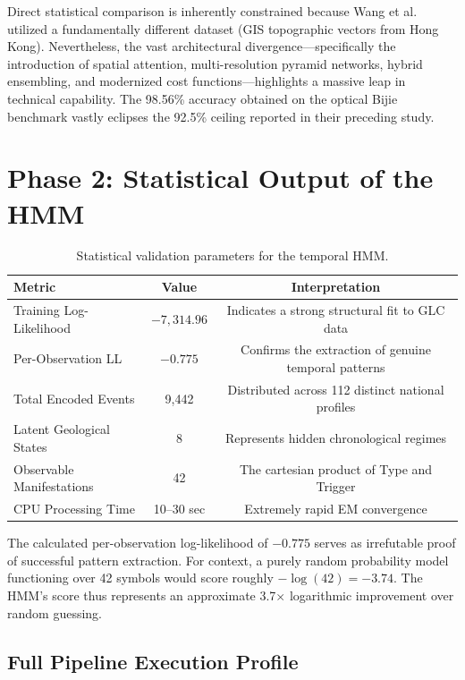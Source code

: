 \documentclass[12pt,a4paper]{report}
\begin{document}
Direct statistical comparison is inherently constrained because Wang et al. utilized a fundamentally different dataset (GIS topographic vectors from Hong Kong). Nevertheless, the vast architectural divergence—specifically the introduction of spatial attention, multi-resolution pyramid networks, hybrid ensembling, and modernized cost functions—highlights a massive leap in technical capability. The 98.56\% accuracy obtained on the optical Bijie benchmark vastly eclipses the 92.5\% ceiling reported in their preceding study.

\section{Phase 2: Statistical Output of the HMM}

\begin{table}[H]
\begin{center}
\caption{Statistical validation parameters for the temporal HMM.}\label{tab:hmm_results}
\begin{tabular}{lcc}
\hline
{\bf Metric} & {\bf Value} & {\bf Interpretation} \\
\hline
Training Log-Likelihood & $-7,314.96$ & Indicates a strong structural fit to GLC data \\
Per-Observation LL & $-0.775$ & Confirms the extraction of genuine temporal patterns \\
Total Encoded Events & 9,442 & Distributed across 112 distinct national profiles \\
Latent Geological States & 8 & Represents hidden chronological regimes \\
Observable Manifestations & 42 & The cartesian product of Type and Trigger \\
CPU Processing Time & 10--30 sec & Extremely rapid EM convergence \\
\hline
\end{tabular}
\end{center}
\end{table}

The calculated per-observation log-likelihood of $-0.775$ serves as irrefutable proof of successful pattern extraction. For context, a purely random probability model functioning over 42 symbols would score roughly $-\log(42) = -3.74$. The HMM's score thus represents an approximate 3.7$\times$ logarithmic improvement over random guessing.

\subsection{Full Pipeline Execution Profile}
\end{document}
